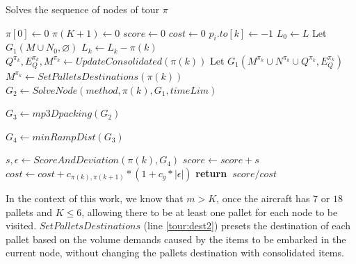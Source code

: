 \documentclass[preprint,authoryear]{elsarticle}
\renewcommand{\Return}{\State \bf {return}~}
\begin{document}
\begin{algorithm}[H]
	\caption{ Solves the sequence of nodes of tour $\pi$ }  \label{alg:tour}
	
	\begin{algorithmic}[1]
		
		
		\State $\pi[0] \gets 0$ \label{tour:pi1}
		\State $\pi(K+1) \gets 0$ \label{tour:pi2}
		\State $score \gets 0$ \label{tour:score}
		\State $cost \gets 0$ \label{tour:cost}
		 \label{tour:loop1}		
				\State $p_i.to[k] \gets -1$ \label{tour:-1} 
			\EndFor	
				\State $L_0 \gets L$
				\State Let $G_1(M \cup N_0, \varnothing)$ \label{tour:g11}
			\Else
				\State $L_k \gets L_k - \pi(k)$  \label{tour:lk1}			
				\State $Q^{\pi_k}, E_Q^{\pi_k}, M^{\pi_k} \gets UpdateConsolidated(\pi(k))$ \label{tour:dest}			
				\State Let $G_1(M^{\pi_k} \cup N^{\pi_k} \cup Q^{\pi_k}, E_Q^{\pi_k})$ \label{tour:g12}
			\EndIf  \label{tour:lk2}	
			\State $M^{\pi_k} \gets SetPalletsDestinations( \pi(k) )$ \label{tour:dest2}		
			\State $G_2 \gets SolveNode(method, \pi(k), G_1, timeLim)$ \label{tour:node}

{\color{purple} \State	$G_3 \gets mp3Dpacking(G_2)$  \label{tour:3dpacking} }	
		
{\color{blue}   \State	$G_4 \gets minRampDist(G_3)$  \label{tour:minRampDist} }
			
			\State $s, \epsilon \gets ScoreAndDeviation(\pi(k), G_4)$ \label{tour:analyse}
			\State $score \gets score + s$ \label{tour:score2}
			\State $cost \gets cost + c_{\pi(k),\pi(k+1)} * (1 + c_g * |\epsilon|)$ \label{tour:cost2} 
		\EndFor  \label{tour:loop2}
		\Return $score / cost$ \label{tour:f}
		
		\EndProcedure
		
	\end{algorithmic}
\end{algorithm}


In the context of this work, we know that $m>K$, once the aircraft has $7$\/ or $18$\/ pallets and $K\leq 6$, allowing there to be at least one pallet for each node to be visited. $SetPalletsDestinations$\/ (line \ref{tour:dest2}) presets the destination of each pallet based on the volume demands caused by the items to be embarked in the current node, without changing the pallets destination with consolidated items.
\end{document}
